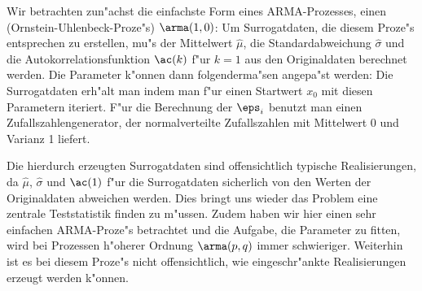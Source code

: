 Wir betrachten zun"achst die einfachste Form eines ARMA-Prozesses, einen
\begriff(Ornstein-Uhlenbeck-Proze"s) $\arma(1,0)$:
Um Surrogatdaten, die diesem Proze"s entsprechen zu erstellen, mu"s der Mittelwert
$\hat\mu$, die Standardabweichung $\hat\sigma$ und die Autokorrelationsfunktion $\ac(k)$
f"ur $k=1$ aus den Originaldaten berechnet werden. Die Parameter k"onnen dann
folgenderma"sen angepa"st werden:
Die Surrogatdaten erh"alt man indem man  f"ur einen Startwert $x_0$ mit
diesen Parametern iteriert. F"ur die Berechnung der $\eps_i$ benutzt man einen
Zufallszahlengenerator, der normalverteilte Zufallszahlen mit Mittelwert 0 und Varianz 1
liefert.  

Die hierdurch erzeugten Surrogatdaten sind offensichtlich typische Realisierungen, da
$\hat\mu$, $\hat\sigma$ und $\ac(1)$ f"ur die Surrogatdaten sicherlich von den Werten der
Originaldaten abweichen werden.  Dies bringt uns wieder das Problem eine zentrale
Teststatistik finden zu m"ussen.  Zudem haben wir hier einen sehr einfachen ARMA-Proze"s
betrachtet und die Aufgabe, die Parameter zu fitten, wird bei Prozessen h"oherer Ordnung
$\arma(p,q)$ immer schwieriger.  Weiterhin ist es bei diesem Proze"s nicht offensichtlich,
wie eingeschr"ankte Realisierungen erzeugt werden k"onnen.



